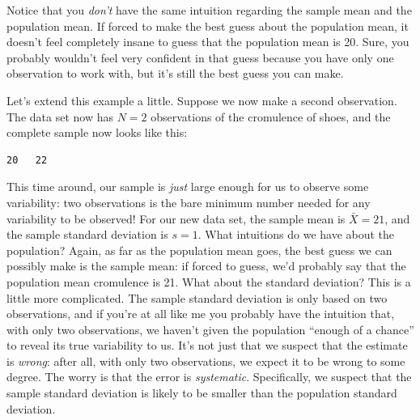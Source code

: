 \documentclass[
  11pt,
  a4paper,
  twoside,symmetric,openright]{book}
\theoremstyle{break}
\theoremstyle{break}
\begin{document}
Notice that you \emph{don't} have the same intuition regarding the sample mean and the population mean. If forced to make the best guess about the population mean, it doesn't feel completely insane to guess that the population mean is 20. Sure, you probably wouldn't feel very confident in that guess because you have only one observation to work with, but it's still the best guess you can make.

Let's extend this example a little. Suppose we now make a second observation. The data set now has \(N=2\) observations of the cromulence of shoes, and the complete sample now looks like this:

\begin{verbatim}
20   22
\end{verbatim}

This time around, our sample is \emph{just} large enough for us to observe some variability: two observations is the bare minimum number needed for any variability to be observed! For our new data set, the sample mean is \(\bar{X}=21\), and the sample standard deviation is \(s=1\). What intuitions do we have about the population? Again, as far as the population mean goes, the best guess we can possibly make is the sample mean: if forced to guess, we'd probably say that the population mean cromulence is 21. What about the standard deviation? This is a little more complicated. The sample standard deviation is only based on two observations, and if you're at all like me you probably have the intuition that, with only two observations, we haven't given the population ``enough of a chance'' to reveal its true variability to us. It's not just that we suspect that the estimate is \emph{wrong}: after all, with only two observations, we expect it to be wrong to some degree. The worry is that the error is \emph{systematic}. Specifically, we suspect that the sample standard deviation is likely to be smaller than the population standard deviation.
\end{document}
